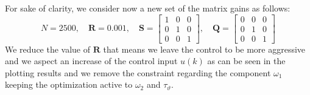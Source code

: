 \documentclass[11pt,a4paper,oneside]{book}
\numberwithin{equation}{section}
\theoremstyle{it}
\theoremstyle{definition}
\begin{document}
For sake of clarity, we consider now a new set of the matrix gains as follows: 
\begin{equation}
	N=2500,\quad\mathbf{R}=0.001,\quad\mathbf{S}=\begin{bmatrix} 
		1&0&0\\0&1&0\\0&0&1 \end{bmatrix},\quad\mathbf{Q}=\begin{bmatrix} 
		0&0&0\\0&1&0\\0&0&1 \end{bmatrix}
\end{equation}
We reduce the value of $\mathbf{R}$ that means we leave the control to be more 
aggressive and we aspect an increase of the control input $u(k)$ as can be seen 
in the plotting results and we remove the constraint regarding the component 
$\omega_1$ keeping the optimization active to $\omega_2$ and $\tau_{\vartheta}$.
\end{document}
